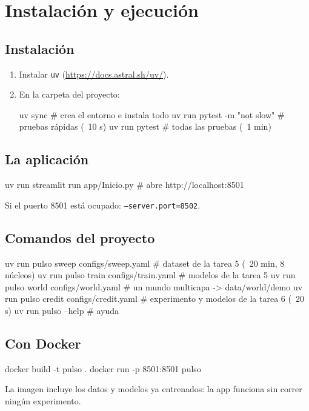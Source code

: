 \chapter{Instalación y ejecución}

\section{Instalación}
\begin{enumerate}
\item Instalar \texttt{uv} (\url{https://docs.astral.sh/uv/}).
\item En la carpeta del proyecto:
\begin{codigo}[label=terminal]
uv sync                      # crea el entorno e instala todo
uv run pytest -m "not slow"  # pruebas rápidas (~10 s)
uv run pytest                # todas las pruebas (~1 min)
\end{codigo}
\end{enumerate}

\section{La aplicación}
\begin{codigo}[label=terminal]
uv run streamlit run app/Inicio.py      # abre http://localhost:8501
\end{codigo}
Si el puerto 8501 está ocupado: \texttt{--server.port=8502}.

\section{Comandos del proyecto}
\begin{codigo}[label=terminal]
uv run pulso sweep  configs/sweep.yaml    # dataset de la tarea 5 (~20 min, 8 núcleos)
uv run pulso train  configs/train.yaml    # modelos de la tarea 5
uv run pulso world  configs/world.yaml    # un mundo multicapa -> data/world/demo
uv run pulso credit configs/credit.yaml   # experimento y modelos de la tarea 6 (~20 s)
uv run pulso --help                       # ayuda
\end{codigo}

\section{Con Docker}
\begin{codigo}[label=terminal]
docker build -t pulso .
docker run -p 8501:8501 pulso
\end{codigo}
La imagen incluye los datos y modelos ya entrenados: la app funciona sin correr
ningún experimento.


